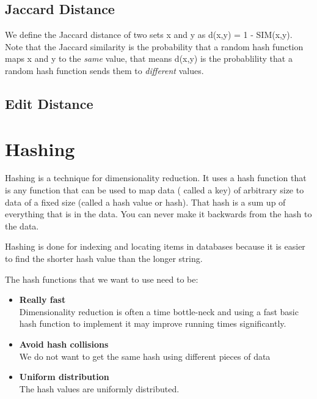 \documentclass[12pt]{article}
\begin{document}
\subsection{Jaccard Distance}

We define the Jaccard distance of two sets x and y as d(x,y) = 1 - SIM(x,y). Note that the Jaccard similarity is the probability that a random hash function maps x and y to the \textit{same} value, that means d(x,y) is the probablility that a random hash function sends them to \textit{different} values.

\subsection{Edit Distance}


\section{Hashing}

Hashing is a technique for dimensionality reduction. It uses a hash function that is any function that can be used to map data ( called a key) of arbitrary size to data of a fixed size (called a hash value or hash). That hash is a sum up of everything that is in the data. You can never make it backwards from the hash to the data.

Hashing is done for indexing and locating items in databases because it is easier to find the shorter hash value than the longer string.

The hash functions that we want to use need to be: 

\begin{itemize}
\item \textbf{Really fast}\\
Dimensionality reduction is often a time bottle-neck and using a fast basic hash function to implement it may improve running times significantly. 
\item \textbf{Avoid hash collisions}\\
We do not want to get the same hash using different pieces of data %
\item \textbf{Uniform distribution}\\
The hash values are uniformly distributed.

\end{itemize}
\end{document}

